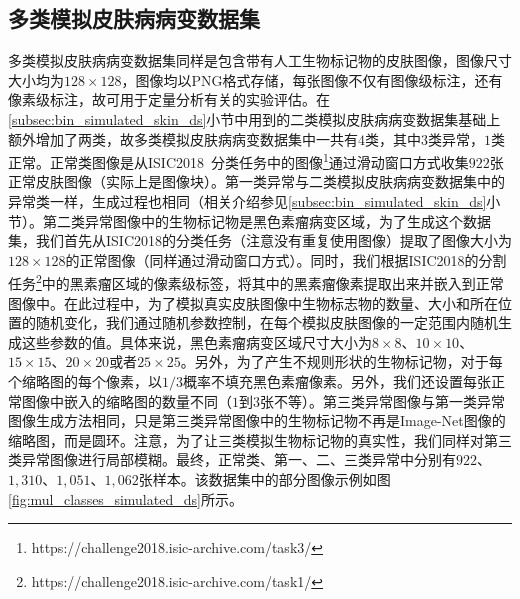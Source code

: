 \subsection{多类模拟皮肤病病变数据集}
多类模拟皮肤病病变数据集同样是包含带有人工生物标记物的皮肤图像，图像尺寸大小均为$128\times 128$，图像均以PNG格式存储，每张图像不仅有图像级标注，还有像素级标注，故可用于定量分析有关的实验评估。在\ref{subsec:bin_simulated_skin_ds}小节中用到的二类模拟皮肤病病变数据集基础上额外增加了两类，故多类模拟皮肤病病变数据集中一共有$4$类，其中$3$类异常，$1$类正常。正常类图像是从ISIC2018~\cite{codella2019skin, tschandl2018ham10000}分类任务中的图像\footnote{https://challenge2018.isic-archive.com/task3/}通过滑动窗口方式收集$922$张正常皮肤图像（实际上是图像块）。第一类异常与二类模拟皮肤病病变数据集中的异常类一样，生成过程也相同（相关介绍参见\ref{subsec:bin_simulated_skin_ds}小节）。第二类异常图像中的生物标记物是黑色素瘤病变区域，为了生成这个数据集，我们首先从ISIC2018的分类任务（注意没有重复使用图像）提取了图像大小为$128\times 128$的正常图像（同样通过滑动窗口方式）。同时，我们根据ISIC2018的分割任务\footnote{https://challenge2018.isic-archive.com/task1/}中的黑素瘤区域的像素级标签，将其中的黑素瘤像素提取出来并嵌入到正常图像中。在此过程中，为了模拟真实皮肤图像中生物标志物的数量、大小和所在位置的随机变化，我们通过随机参数控制，在每个模拟皮肤图像的一定范围内随机生成这些参数的值。具体来说，黑色素瘤病变区域尺寸大小为$8\times 8$、$10\times 10$、$15\times 15$、$20\times 20$或者$25\times 25$。另外，为了产生不规则形状的生物标记物，对于每个缩略图的每个像素，以$1/3$概率不填充黑色素瘤像素。另外，我们还设置每张正常图像中嵌入的缩略图的数量不同（$1$到$3$张不等）。第三类异常图像与第一类异常图像生成方法相同，只是第三类异常图像中的生物标记物不再是Image-Net图像的缩略图，而是圆环。注意，为了让三类模拟生物标记物的真实性，我们同样对第三类异常图像进行局部模糊。最终，正常类、第一、二、三类异常中分别有$922$、$1,310$、$1,051$、$1,062$张样本。该数据集中的部分图像示例如图\ref{fig:mul_classes_simulated_ds}所示。
